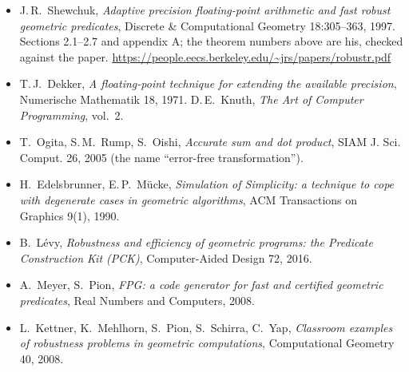 \documentclass[11pt,a4paper]{article}
\theoremstyle{definition}
\theoremstyle{remark}
\begin{document}
\begin{itemize}
  \item J.\,R.~Shewchuk, \emph{Adaptive precision floating-point arithmetic and fast robust
    geometric predicates}, Discrete \& Computational Geometry 18:305--363, 1997. Sections 2.1--2.7
    and appendix A; the theorem numbers above are his, checked against the paper.
    \url{https://people.eecs.berkeley.edu/~jrs/papers/robustr.pdf}
  \item T.\,J.~Dekker, \emph{A floating-point technique for extending the available precision},
    Numerische Mathematik 18, 1971. D.\,E.~Knuth, \emph{The Art of Computer Programming}, vol.~2.
  \item T.~Ogita, S.\,M.~Rump, S.~Oishi, \emph{Accurate sum and dot product}, SIAM J. Sci.
    Comput. 26, 2005 (the name ``error-free transformation'').
  \item H.~Edelsbrunner, E.\,P.~M\"ucke, \emph{Simulation of Simplicity: a technique to cope with
    degenerate cases in geometric algorithms}, ACM Transactions on Graphics 9(1), 1990.
  \item B.~L\'evy, \emph{Robustness and efficiency of geometric programs: the Predicate
    Construction Kit (PCK)}, Computer-Aided Design 72, 2016.
  \item A.~Meyer, S.~Pion, \emph{FPG: a code generator for fast and certified geometric
    predicates}, Real Numbers and Computers, 2008.
  \item L.~Kettner, K.~Mehlhorn, S.~Pion, S.~Schirra, C.~Yap, \emph{Classroom examples of
    robustness problems in geometric computations}, Computational Geometry 40, 2008.
\end{itemize}
\end{document}
